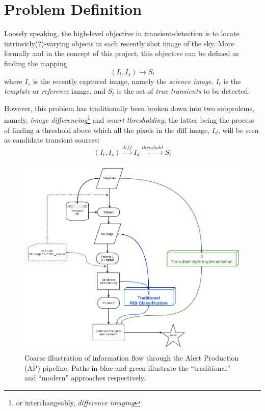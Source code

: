 \section{Problem Definition}

Loosely speaking, the high-level objective in transient-detection is to locate intrinsicly(?)-varying objects in each recently shot image of the sky.
More formally and in the concept of this project, this objective can be defined as finding the mapping
\begin{equation}
  \label{eq:def1}
  (I_t,I_s) \longrightarrow S_t 
\end{equation}
where $I_s$ is the recently captured image, namely the \emph{science image}. $I_t$ is the \emph{template} or \emph{reference} iamge, and $S_t$ is the set of \emph{true transients} to be detected.


However, this problem has traditionally been broken down into two subprolems, namely, \emph{image differencing}\footnote{or interchangeably, \emph{difference imaging}} and \emph{smart-thresholding}; the latter being the process of finding a threshold above which all the pixels in the diff image, $I_d$, will be seen as candidate transient sources:
\begin{equation}
  \label{eq:def2}
  (I_t,I_s) \xrightarrow{diff} I_d \xrightarrow{threshold} S_t 
\end{equation}

\begin{figure}[h]
  \centering
  \includegraphics[width=.8\textwidth]{material/diagram}
  \caption{Coarse illustration of information flow through the Alert Production (AP) pipeline. Paths in blue and green illustrate the ``traditional'' and ``modern'' approaches respectively.}
  \label{fig:diagram}
\end{figure}


